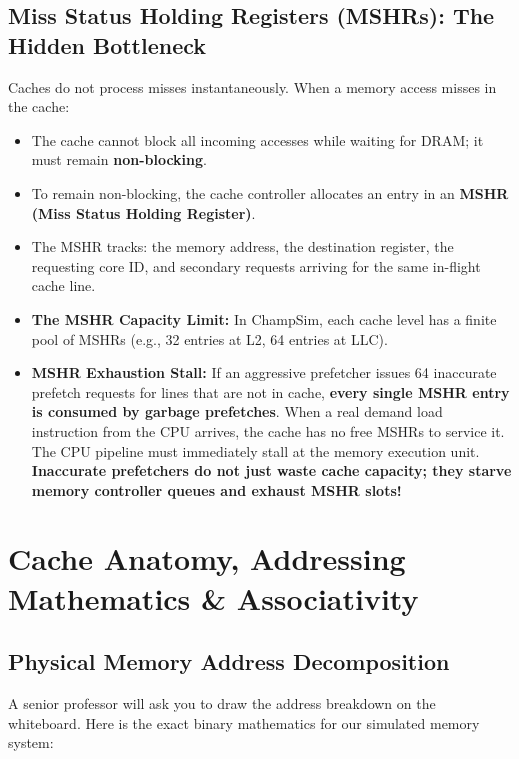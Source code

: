 \documentclass[11pt, a4paper]{article}
\begin{document}
\subsection{Miss Status Holding Registers (MSHRs): The Hidden Bottleneck}
Caches do not process misses instantaneously. When a memory access misses in the cache:
\begin{itemize}[leftmargin=1.5em]
  \item The cache cannot block all incoming accesses while waiting for DRAM; it must remain \textbf{non-blocking}.
  \item To remain non-blocking, the cache controller allocates an entry in an \textbf{MSHR (Miss Status Holding Register)}.
  \item The MSHR tracks: the memory address, the destination register, the requesting core ID, and secondary requests arriving for the same in-flight cache line.
  \item \textbf{The MSHR Capacity Limit:} In ChampSim, each cache level has a finite pool of MSHRs (e.g., 32 entries at L2, 64 entries at LLC).
  \item \textbf{MSHR Exhaustion Stall:} If an aggressive prefetcher issues 64 inaccurate prefetch requests for lines that are not in cache, \textbf{every single MSHR entry is consumed by garbage prefetches}. When a real demand load instruction from the CPU arrives, the cache has no free MSHRs to service it. The CPU pipeline must immediately stall at the memory execution unit. \textbf{Inaccurate prefetchers do not just waste cache capacity; they starve memory controller queues and exhaust MSHR slots!}
\end{itemize}

\newpage

\section{Cache Anatomy, Addressing Mathematics \& Associativity}

\subsection{Physical Memory Address Decomposition}
A senior professor will ask you to draw the address breakdown on the whiteboard. Here is the exact binary mathematics for our simulated memory system:
\end{document}
